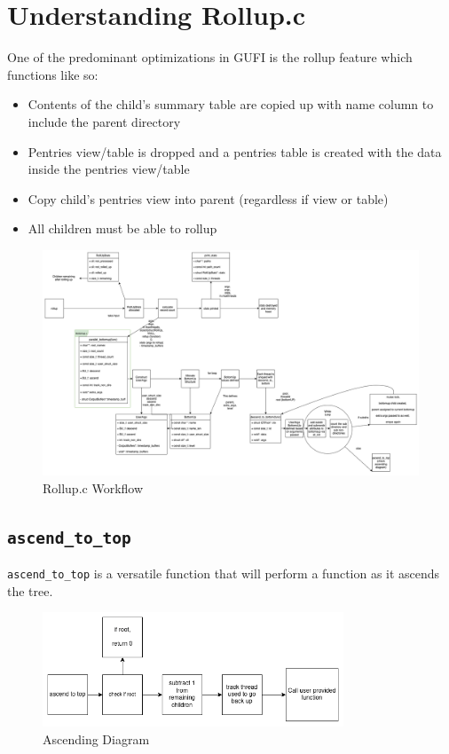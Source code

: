 \section{Understanding Rollup.c}
One of the predominant optimizations in GUFI is the rollup feature which functions like so: \\
\begin{itemize}
  \item Contents of the child's summary table are copied up with name column to include the parent directory
  \item Pentries view/table is dropped and a pentries table is created with the data inside the pentries view/table
  \item Copy child's pentries view into parent (regardless if view or table)
  \item All children must be able to rollup
\end{itemize}


\begin{figure} [h]
\centering
\includegraphics[width=1.2\textwidth]{images/rollup.png}
\caption{\label{fig:rollup}Rollup.c Workflow}
\end{figure}

\clearpage

\subsection{\texttt {ascend\_to\_top}}
\texttt{ascend\_to\_top} is a versatile function that will perform a function as it ascends the tree.

\begin{figure} [h]
\centering
\includegraphics[width=0.8\textwidth]{images/ascending.png}
\caption{\label{fig:ascending_diagram} Ascending Diagram}
\end{figure}

